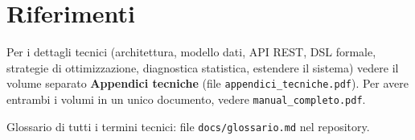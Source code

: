 \tableofcontents








\appendix
\chapter{Riferimenti}
Per i dettagli tecnici (architettura, modello dati, API REST,
DSL formale, strategie di ottimizzazione, diagnostica
statistica, estendere il sistema) vedere il volume separato
\textbf{Appendici tecniche} (file
\texttt{appendici\_tecniche.pdf}). Per avere entrambi i volumi
in un unico documento, vedere \texttt{manual\_completo.pdf}.

Glossario di tutti i termini tecnici: file
\texttt{docs/glossario.md} nel repository.


